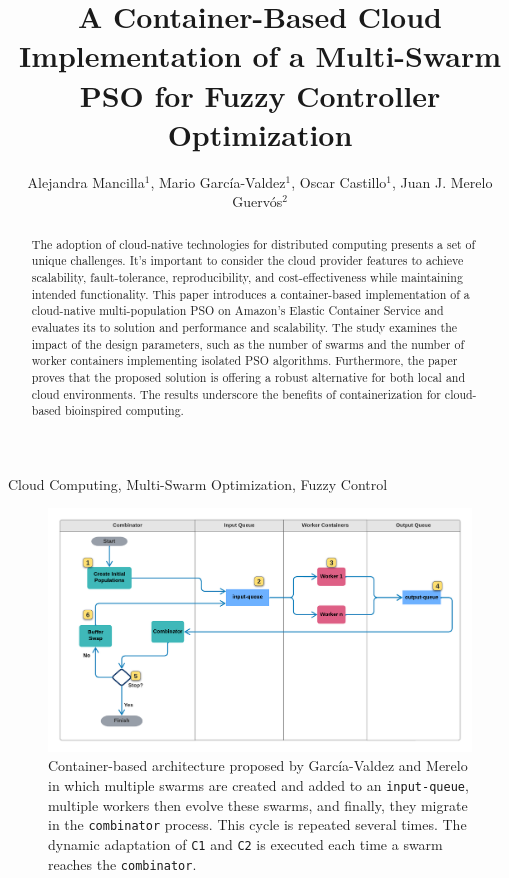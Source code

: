 \documentclass{cys}
\title{A Container-Based Cloud Implementation of a Multi-Swarm PSO for Fuzzy Controller Optimization}
\author{Alejandra Mancilla$^1$, Mario García-Valdez$^1$, Oscar Castillo$^1$, Juan J. Merelo Guerv\'os$^2$}
\affil{ 
$^1$  Tijuana Institute of Technology / Tecnol\'ogico Nacional de M\'exico,   \authorcr   %
Tijuana, Mexico

\authorcr \authorcr
$^2$  University of Granada, Department of Computer Engineering, Automatics and Robotics, \authorcr
Granada, Spain            
\authorcr  \authorcr
\{alejandra.mancilla,mario\}@tectijuana.edu.mx, ocastillo@tectijuana.mx, jmerelo@ugr.es
\authorcr  \authorcr
}
\begin{document}
\maketitle

\renewcommand{\tablename}{Table}

\begin{abstract}

The adoption of cloud-native technologies for distributed computing presents a
set of unique challenges. It's important to consider the cloud provider features
to achieve scalability, fault-tolerance, reproducibility, and cost-effectiveness
while maintaining intended functionality. This paper introduces a
container-based implementation of a cloud-native multi-population PSO on
Amazon's Elastic Container Service and evaluates its to solution and performance and
scalability. The study examines the impact of the design parameters, such as
the number of swarms and the number of worker containers implementing isolated
PSO algorithms. Furthermore, the paper proves that the proposed solution
is offering a robust alternative for both local and cloud environments. The
results underscore the benefits of containerization for cloud-based bioinspired
computing.

\end{abstract}

\begin{keywords} 
Cloud Computing, Multi-Swarm Optimization, Fuzzy Control
\end{keywords} 

\begin{figure}[ht]
\centering
\includegraphics[width=\textwidth]{KafkEO}
\caption{Container-based architecture proposed by García-Valdez and Merelo \cite{valdez2021container} 
in which multiple swarms are created and
added to an \texttt{input-queue}, multiple workers then evolve these swarms, and finally,
they migrate in the \texttt{combinator} process. This cycle is repeated several times.
The dynamic adaptation of \texttt{C1} and \texttt{C2} %
is executed each time a swarm reaches the
\texttt{combinator}.}
\label{fig:KafkEO}
\end{figure}
\end{document}
